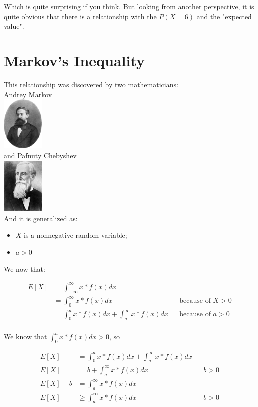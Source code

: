 \documentclass[10pt,a4paper]{book}
\begin{document}
Which is quite surprising if you think. But looking from another perspective, it is quite obvious that there is a relationship with the $P(X=6)$ and the "expected value".
	
\section{Markov's Inequality}

This relationship was discovered by two mathematicians:\\	
Andrey Markov\\
\includegraphics[width=2cm]{AAMarkov}\\

and Pafnuty Chebyshev\\
\includegraphics[width=2cm]{Chebyshev}\\

And it is generalized as:
\begin{itemize}
	\item {$X$ is a nonnegative random variable;}
	\item {$a > 0$}
\end{itemize}	

We now that:

\begin{align*}
	E[X] &= \int_{-\infty}^{\infty}{x*f(x)dx}\\
	&= \int_{0}^{\infty}{x*f(x)dx} && \text{because of } X > 0\\
	&= \int_{0}^{a}{x*f(x)dx} + \int_{a}^{\infty}{x*f(x)dx} && \text{because of } a > 0\\	
\end{align*}

We know that $\int_{0}^{a}{x*f(x)dx} > 0$, so

\begin{align*}
	E[X] &= \int_{0}^{a}{x*f(x)dx} + \int_{a}^{\infty}{x*f(x)dx}\\
	E[X] &= b + \int_{a}^{\infty}{x*f(x)dx} && b > 0\\
	E[X] - b &= \int_{a}^{\infty}{x*f(x)dx}\\
	E[X] &\ge \int_{a}^{\infty}{x*f(x)dx} && b > 0\\
\end{align*}
\end{document}
